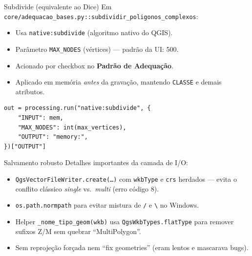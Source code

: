 \documentclass[10pt,aspectratio=169]{beamer}
\begin{document}
\begin{frame}[fragile]{Subdivide (equivalente ao Dice)}
  Em \texttt{core/adequacao\_bases.py::subdividir\_poligonos\_complexos}:
  \begin{itemize}
    \item Usa \texttt{native:subdivide} (algoritmo nativo do QGIS).
    \item Parâmetro \texttt{MAX\_NODES} (vértices) — padrão da UI: 500.
    \item Acionado por checkbox no \textbf{Padrão de Adequação}.
    \item Aplicado em memória \emph{antes} da gravação, mantendo \texttt{CLASSE} e demais atributos.
  \end{itemize}
  \begin{lstlisting}[style=py]
out = processing.run("native:subdivide", {
    "INPUT": mem,
    "MAX_NODES": int(max_vertices),
    "OUTPUT": "memory:",
})["OUTPUT"]
  \end{lstlisting}
\end{frame}

\begin{frame}{Salvamento robusto}
  Detalhes importantes da camada de I/O:
  \begin{itemize}
    \item \texttt{QgsVectorFileWriter.create(\ldots)} com \texttt{wkbType} e \texttt{crs} herdados — evita o conflito clássico \emph{single} vs.\ \emph{multi} (erro código 8).
    \item \texttt{os.path.normpath} para evitar mistura de \texttt{/} e \texttt{\textbackslash{}} no Windows.
    \item Helper \texttt{\_nome\_tipo\_geom(wkb)} usa \texttt{QgsWkbTypes.flatType} para remover sufixos Z/M sem quebrar ``MultiPolygon''.
    \item Sem reprojeção forçada nem ``fix geometries'' (eram lentos e mascarava bugs).
  \end{itemize}
\end{frame}
\end{document}
